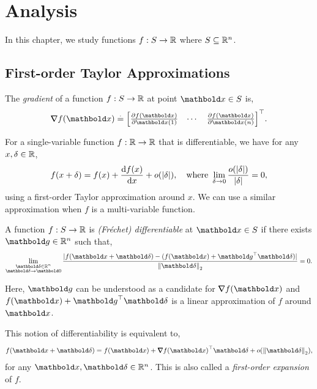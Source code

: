 
\chapter{Analysis}

In this chapter, we study functions $f: S \to \mathbb{R}$ where $S \subseteq \mathbb{R}^n$.

\section{First-order Taylor Approximations}

\begin{defn}[Gradient] The \emph{gradient} of a function $f: S \to \mathbb{R}$ at point $\vx \in \sS$ is, \begin{align}
    \grad f(\vx) \defeq \trans{\begin{bmatrix}
        \pdv{f(\vx)}{\vx(1)} & \cdots & \pdv{f(\vx)}{\vx(n)}
    \end{bmatrix}}.
\end{align}
\end{defn}

For a single-variable function $f: \mathbb{R} \to \mathbb{R}$ that is differentiable, we have for any $x, \delta \in \mathbb{R}$, \begin{align*}
    f(x + \delta) = f(x) + \odv{f(x)}{x} + o(|\delta|), \quad \text{where } \lim_{\delta \to 0} \frac{o(|\delta|)}{|\delta|} = 0,
\end{align*} using a first-order Taylor approximation around $x$. We can use a similar approximation when $f$ is a multi-variable function.

\begin{defn} A function $f: S \to \mathbb{R}$ is \emph{(Fréchet) differentiable} at $\vx \in \sS$ if there exists $\vg \in \R^n$ such that, \begin{align}
    \lim_{\substack{\vdelta \in \R^n \\ \vdelta \to \vZero}} \frac{|f(\vx + \vdelta) - (f(\vx) + \trans{\vg}\vdelta)|}{\norm{\vdelta}_2} = 0.
\end{align}
\end{defn}\noindent Here, $\vg$ can be understood as a candidate for $\grad f(\vx)$ and $f(\vx) + \trans{\vg}\vdelta$ is a linear approximation of $f$ around $\vx$.

This notion of differentiability is equivalent to, \begin{align}
    f(\vx + \vdelta) = f(\vx) + \trans{\grad f(\vx)}\vdelta + o(\norm{\vdelta}_2),
\end{align} for any $\vx, \vdelta \in \R^n$. This is also called a \emph{first-order expansion} of $f$.

